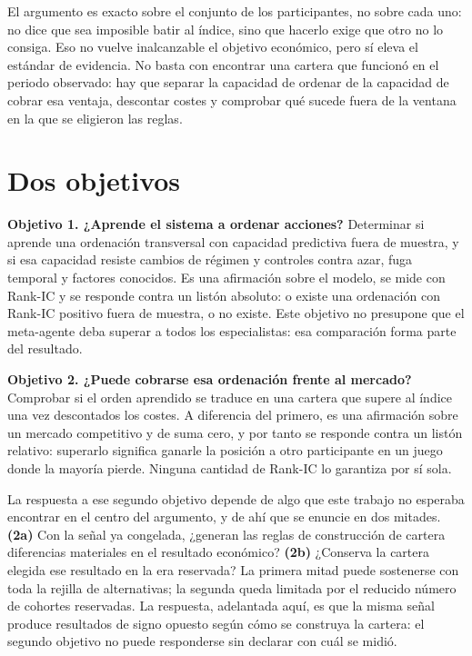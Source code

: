 El argumento es exacto sobre el conjunto de los participantes, no sobre cada uno: no dice que sea
imposible batir al índice, sino que hacerlo exige que otro no lo consiga. Eso no vuelve inalcanzable
el objetivo económico, pero sí eleva el estándar de evidencia. No basta con encontrar una cartera
que funcionó en el periodo observado: hay que separar la capacidad de ordenar de la capacidad de
cobrar esa ventaja, descontar costes y comprobar qué sucede fuera de la ventana en la que se
eligieron las reglas.

\section{Dos objetivos}

\textbf{Objetivo 1. ¿Aprende el sistema a ordenar acciones?} Determinar si aprende una ordenación
transversal con capacidad predictiva fuera de muestra, y si esa capacidad resiste cambios de régimen
y controles contra azar, fuga temporal y factores conocidos. Es una afirmación sobre el modelo, se
mide con Rank-IC y se responde contra un listón absoluto: o existe una ordenación con Rank-IC
positivo fuera de muestra, o no existe. Este objetivo no presupone que el meta-agente deba superar a
todos los especialistas: esa comparación forma parte del resultado.

\textbf{Objetivo 2. ¿Puede cobrarse esa ordenación frente al mercado?} Comprobar si el orden
aprendido se traduce en una cartera que supere al índice una vez descontados los costes. A diferencia
del primero, es una afirmación sobre un mercado competitivo y de suma cero, y por tanto se responde
contra un listón relativo: superarlo significa ganarle la posición a otro participante en un juego
donde la mayoría pierde. Ninguna cantidad de Rank-IC lo garantiza por sí sola.

La respuesta a ese segundo objetivo depende de algo que este trabajo no esperaba encontrar en el
centro del argumento, y de ahí que se enuncie en dos mitades. \textbf{(2a)} Con la señal ya
congelada, ¿generan las reglas de construcción de cartera diferencias materiales en el resultado
económico? \textbf{(2b)} ¿Conserva la cartera elegida ese resultado en la era reservada? La primera
mitad puede sostenerse con toda la rejilla de alternativas; la segunda queda limitada por el reducido
número de cohortes reservadas. La respuesta, adelantada aquí, es que la misma señal produce
resultados de signo opuesto según cómo se construya la cartera: el segundo objetivo no puede
responderse sin declarar con cuál se midió.

